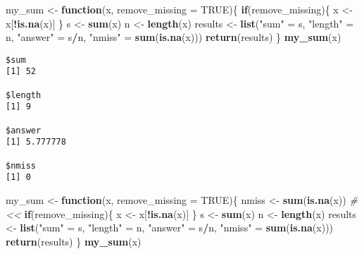 \documentclass[12pt,letterpaperpaper,openany]{book}
\newenvironment{Shaded}{\begin{snugshade}}{\end{snugshade}}
\newcommand{\CommentTok}[1]{\textcolor[rgb]{0.56,0.35,0.01}{\textit{#1}}}
\newcommand{\ControlFlowTok}[1]{\textcolor[rgb]{0.13,0.29,0.53}{\textbf{#1}}}
\newcommand{\DataTypeTok}[1]{\textcolor[rgb]{0.13,0.29,0.53}{#1}}
\newcommand{\KeywordTok}[1]{\textcolor[rgb]{0.13,0.29,0.53}{\textbf{#1}}}
\newcommand{\NormalTok}[1]{#1}
\newcommand{\OperatorTok}[1]{\textcolor[rgb]{0.81,0.36,0.00}{\textbf{#1}}}
\newcommand{\OtherTok}[1]{\textcolor[rgb]{0.56,0.35,0.01}{#1}}
\newcommand{\StringTok}[1]{\textcolor[rgb]{0.31,0.60,0.02}{#1}}
\begin{document}
\begin{Shaded}
\begin{Highlighting}[]
\NormalTok{my_sum <-}\StringTok{ }\ControlFlowTok{function}\NormalTok{(x, }\DataTypeTok{remove_missing =} \OtherTok{TRUE}\NormalTok{)\{ }
  \ControlFlowTok{if}\NormalTok{(remove_missing)\{}
\NormalTok{    x <-}\StringTok{ }\NormalTok{x[}\OperatorTok{!}\KeywordTok{is.na}\NormalTok{(x)]}
\NormalTok{  \}}
\NormalTok{  s <-}\StringTok{ }\KeywordTok{sum}\NormalTok{(x)}
\NormalTok{  n <-}\StringTok{ }\KeywordTok{length}\NormalTok{(x)}
\NormalTok{  results <-}\StringTok{ }\KeywordTok{list}\NormalTok{(}\StringTok{"sum"}\NormalTok{ =}\StringTok{ }\NormalTok{s, }\StringTok{"length"}\NormalTok{ =}\StringTok{ }\NormalTok{n, }\StringTok{"answer"}\NormalTok{ =}\StringTok{ }\NormalTok{s}\OperatorTok{/}\NormalTok{n, }\StringTok{"nmiss"}\NormalTok{ =}\StringTok{ }\KeywordTok{sum}\NormalTok{(}\KeywordTok{is.na}\NormalTok{(x)))}
  \KeywordTok{return}\NormalTok{(results) }
\NormalTok{\}}
\KeywordTok{my_sum}\NormalTok{(x)}
\end{Highlighting}
\end{Shaded}

\begin{verbatim}
$sum
[1] 52

$length
[1] 9

$answer
[1] 5.777778

$nmiss
[1] 0
\end{verbatim}

\begin{Shaded}
\begin{Highlighting}[]
\NormalTok{my_sum <-}\StringTok{ }\ControlFlowTok{function}\NormalTok{(x, }\DataTypeTok{remove_missing =} \OtherTok{TRUE}\NormalTok{)\{ }
\NormalTok{  nmiss <-}\StringTok{ }\KeywordTok{sum}\NormalTok{(}\KeywordTok{is.na}\NormalTok{(x)) }\CommentTok{#<<}
  \ControlFlowTok{if}\NormalTok{(remove_missing)\{}
\NormalTok{    x <-}\StringTok{ }\NormalTok{x[}\OperatorTok{!}\KeywordTok{is.na}\NormalTok{(x)]}
\NormalTok{  \}}
\NormalTok{  s <-}\StringTok{ }\KeywordTok{sum}\NormalTok{(x)}
\NormalTok{  n <-}\StringTok{ }\KeywordTok{length}\NormalTok{(x)}
\NormalTok{  results <-}\StringTok{ }\KeywordTok{list}\NormalTok{(}\StringTok{"sum"}\NormalTok{ =}\StringTok{ }\NormalTok{s, }\StringTok{"length"}\NormalTok{ =}\StringTok{ }\NormalTok{n, }\StringTok{"answer"}\NormalTok{ =}\StringTok{ }\NormalTok{s}\OperatorTok{/}\NormalTok{n, }\StringTok{"nmiss"}\NormalTok{ =}\StringTok{ }\KeywordTok{sum}\NormalTok{(}\KeywordTok{is.na}\NormalTok{(x)))}
  \KeywordTok{return}\NormalTok{(results) }
\NormalTok{\}}
\KeywordTok{my_sum}\NormalTok{(x)}
\end{Highlighting}
\end{Shaded}
\end{document}
